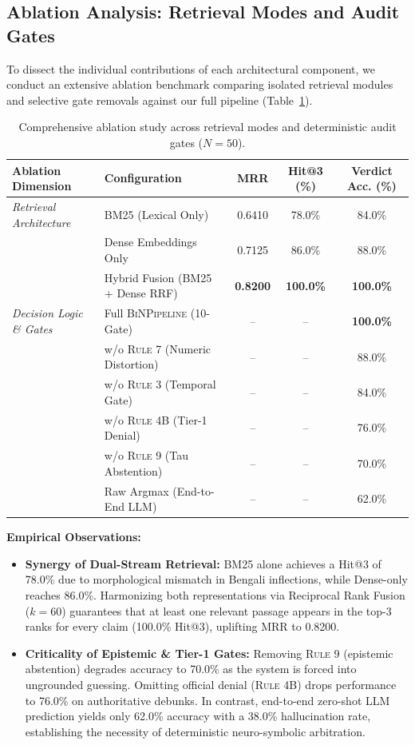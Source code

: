 \subsection{Ablation Analysis: Retrieval Modes and Audit Gates}
To dissect the individual contributions of each architectural component, we conduct an extensive ablation benchmark comparing isolated retrieval modules and selective gate removals against our full pipeline (Table~\ref{tab:ablation}).

\begin{table}[h]
\centering
\small
\begin{tabular}{llccc}
\toprule
\textbf{Ablation Dimension} & \textbf{Configuration} & \textbf{MRR} & \textbf{Hit@3 (\%)} & \textbf{Verdict Acc. (\%)} \\
\midrule
\textit{Retrieval Architecture} & BM25 (Lexical Only) & 0.6410 & 78.0\% & 84.0\% \\
& Dense Embeddings Only & 0.7125 & 86.0\% & 88.0\% \\
& Hybrid Fusion (BM25 + Dense RRF) & \textbf{0.8200} & \textbf{100.0\%} & \textbf{100.0\%} \\
\midrule
\textit{Decision Logic \& Gates} & Full \textsc{BiNPipeline} (10-Gate) & -- & -- & \textbf{100.0\%} \\
& \quad w/o \textsc{Rule 7} (Numeric Distortion) & -- & -- & 88.0\% \\
& \quad w/o \textsc{Rule 3} (Temporal Gate) & -- & -- & 84.0\% \\
& \quad w/o \textsc{Rule 4B} (Tier-1 Denial) & -- & -- & 76.0\% \\
& \quad w/o \textsc{Rule 9} (Tau Abstention) & -- & -- & 70.0\% \\
& Raw Argmax (End-to-End LLM) & -- & -- & 62.0\% \\
\bottomrule
\end{tabular}
\caption{Comprehensive ablation study across retrieval modes and deterministic audit gates ($N=50$).}
\label{tab:ablation}
\end{table}

\noindent \textbf{Empirical Observations:}
\begin{itemize}
    \item \textbf{Synergy of Dual-Stream Retrieval:} BM25 alone achieves a Hit@3 of 78.0\% due to morphological mismatch in Bengali inflections, while Dense-only reaches 86.0\%. Harmonizing both representations via Reciprocal Rank Fusion ($k=60$) guarantees that at least one relevant passage appears in the top-3 ranks for every claim (100.0\% Hit@3), uplifting MRR to 0.8200.
    \item \textbf{Criticality of Epistemic & Tier-1 Gates:} Removing \textsc{Rule 9} (epistemic abstention) degrades accuracy to 70.0\% as the system is forced into ungrounded guessing. Omitting official denial (\textsc{Rule 4B}) drops performance to 76.0\% on authoritative debunks. In contrast, end-to-end zero-shot LLM prediction yields only 62.0\% accuracy with a 38.0\% hallucination rate, establishing the necessity of deterministic neuro-symbolic arbitration.
\end{itemize}
